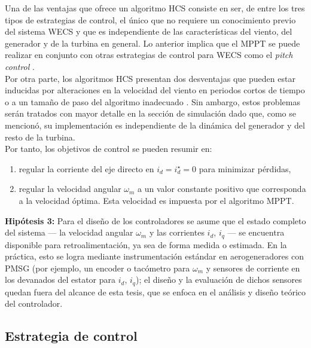 Una de las ventajas que ofrece un algoritmo HCS consiste en ser, de entre los tres tipos de estrategias
de control, el único que no requiere un conocimiento previo del sistema WECS y que es independiente de 
las características del viento, del generador y de la turbina en general. Lo anterior implica que el MPPT
se puede realizar en conjunto con otras estrategias de control para WECS como el \emph{pitch control} 
\cite{kazmi2011}. 
\\

Por otra parte, los algoritmos HCS presentan dos desventajas que pueden estar inducidas por alteraciones 
en la velocidad del viento en periodos cortos de tiempo o a un tamaño de paso del algoritmo inadecuado 
\cite{kazmi2011,xia2013}. Sin ambargo, estos problemas serán tratados con mayor detalle en la sección de
simulación dado que, como se mencionó, su implementación es independiente de la dinámica del generador y 
del resto de la turbina. 
\\

Por tanto, los objetivos de control se pueden resumir en:
\begin{enumerate}
    \item regular la corriente del eje directo en $i_d = i_d^\star = 0$ para minimizar pérdidas,
    \item regular la velocidad angular $\omega_m$ a un valor constante positivo que corresponda a 
        la velocidad óptima. Esta velocidad es impuesta por el algoritmo MPPT.
\end{enumerate}

\textbf{Hipótesis 3:} Para el diseño de los controladores se asume que el estado
completo del sistema --- la velocidad angular $\omega_m$ y las corrientes $i_d$,
$i_q$ --- se encuentra disponible para retroalimentación, ya sea de forma medida
o estimada. En la práctica, esto se logra mediante instrumentación estándar en
aerogeneradores con PMSG (por ejemplo, un encoder o tacómetro para $\omega_m$ y
sensores de corriente en los devanados del estator para $i_d$, $i_q$); el diseño
y la evaluación de dichos sensores quedan fuera del alcance de esta tesis, que se
enfoca en el análisis y diseño teórico del controlador.


\subsection{Estrategia de control}

